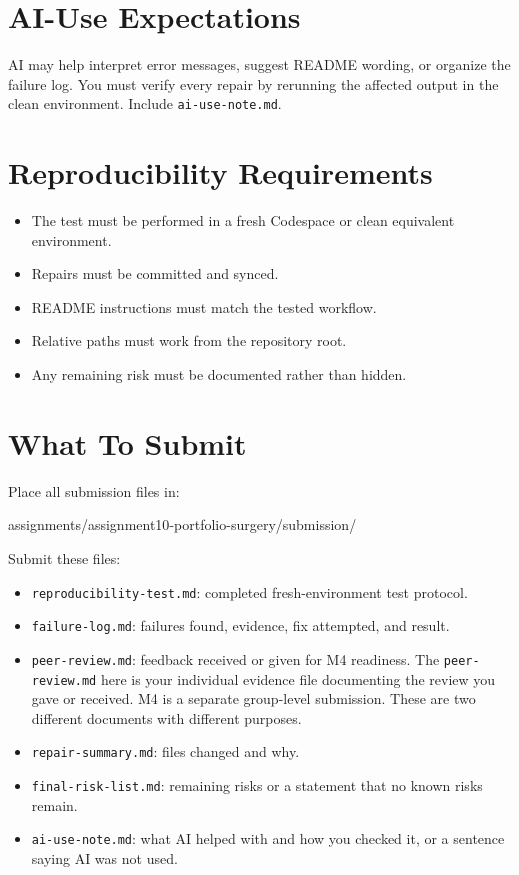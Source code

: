 \documentclass[
  letterpaper,
  DIV=11,
  numbers=noendperiod,
  oneside]{scrreprt}
\newenvironment{Shaded}{\begin{snugshade}}{\end{snugshade}}
\newcommand{\NormalTok}[1]{\textcolor[rgb]{0.00,0.23,0.31}{#1}}
\providecommand{\tightlist}{%
  \setlength{\itemsep}{0pt}\setlength{\parskip}{0pt}}
\begin{document}
\section{AI-Use Expectations}\label{ai-use-expectations-9}

AI may help interpret error messages, suggest README wording, or
organize the failure log. You must verify every repair by rerunning the
affected output in the clean environment. Include
\texttt{ai-use-note.md}.

\section{Reproducibility
Requirements}\label{reproducibility-requirements-9}

\begin{itemize}
\tightlist
\item
  The test must be performed in a fresh Codespace or clean equivalent
  environment.
\item
  Repairs must be committed and synced.
\item
  README instructions must match the tested workflow.
\item
  Relative paths must work from the repository root.
\item
  Any remaining risk must be documented rather than hidden.
\end{itemize}

\section{What To Submit}\label{what-to-submit-9}

Place all submission files in:

\begin{Shaded}
\begin{Highlighting}[numbers=left,,]
\NormalTok{assignments/assignment10{-}portfolio{-}surgery/submission/}
\end{Highlighting}
\end{Shaded}

Submit these files:

\begin{itemize}
\tightlist
\item
  \texttt{reproducibility-test.md}: completed fresh-environment test
  protocol.
\item
  \texttt{failure-log.md}: failures found, evidence, fix attempted, and
  result.
\item
  \texttt{peer-review.md}: feedback received or given for M4 readiness.
  The \texttt{peer-review.md} here is your individual evidence file
  documenting the review you gave or received. M4 is a separate
  group-level submission. These are two different documents with
  different purposes.
\item
  \texttt{repair-summary.md}: files changed and why.
\item
  \texttt{final-risk-list.md}: remaining risks or a statement that no
  known risks remain.
\item
  \texttt{ai-use-note.md}: what AI helped with and how you checked it,
  or a sentence saying AI was not used.
\end{itemize}
\end{document}
